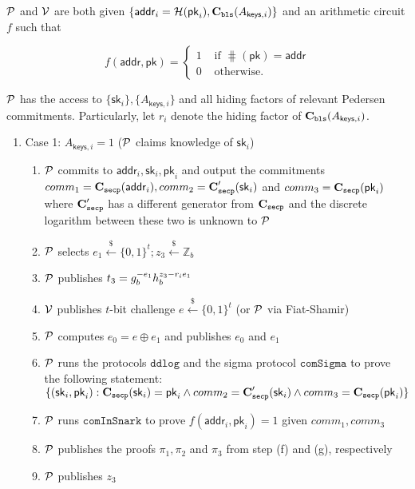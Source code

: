 
\begin{mdframed}
$\mathcal{P}$ and $\mathcal{V}$ are both given $\{\mathsf{addr}_i=\mathcal{H}(\mathsf{pk}_i),\textbf{C}_\texttt{bls}(A_{\mathsf{keys},i})\}$ and an arithmetic circuit $f$ such that 

\[
    f(\mathsf{addr},\mathsf{pk})=\left\{
        \begin{aligned}
            1 & \text{ if } \hash(\mathsf{pk})=\mathsf{addr} \\
            0 & \text{ otherwise.}
        \end{aligned}
    \right.
\]

$\mathcal{P}$ has the access to $\{\mathsf{sk}_i\},\{A_{\mathsf{keys},i}\}$ and all hiding factors of relevant Pedersen commitments. Particularly, let $r_i$ denote the hiding factor of $\textbf{C}_\texttt{bls}(A_{\mathsf{keys},i})$.
\begin{enumerate}   
    \item Case 1: $A_{\mathsf{keys},i}=1$ ($\mathcal{P}$ claims knowledge of $\mathsf{sk}_i$)
    \begin{enumerate}  
        \item $\mathcal{P}$ commits to $\mathsf{addr}_i,\mathsf{sk}_i,\mathsf{pk}_i$ and output the commitments $comm_1=\textbf{C}_\texttt{secp}(\mathsf{addr}_i),comm_2=\textbf{C}_\texttt{secp}^\prime(\mathsf{sk}_i)$ and $comm_3=\textbf{C}_\texttt{secp}(\mathsf{pk}_i)$ where $\textbf{C}_\texttt{secp}^\prime$ has a different generator from $\textbf{C}_\texttt{secp}$ and the discrete logarithm between these two is unknown to $\mathcal{P}$
        \item $\mathcal{P}$ selects $e_1\stackrel{\$}{\leftarrow} \{0,1\}^t; z_3\stackrel{\$}{\leftarrow}\mathbb{Z}_b$
        \item $\mathcal{P}$ publishes $t_3=g_b^{-e_1}h_b^{z_3-r_ie_1}$
        \item $\mathcal{V}$ publishes $t$-bit challenge $e\stackrel{\$}{\leftarrow} \{0,1\}^t$ (or $\mathcal{P}$ via Fiat-Shamir)
        \item $\mathcal{P}$ computes $e_0=e\oplus{e_1}$ and publishes $e_0$ and $e_1$
        \item $\mathcal{P}$ runs the protocols $\texttt{ddlog}$ and the sigma protocol $\texttt{comSigma}$ to prove the following statement: $\{(\mathsf{sk}_i,\mathsf{pk}_i):\textbf{C}_\texttt{secp}(\mathsf{sk}_i)=\mathsf{pk}_i\land{comm_2}=\textbf{C}_\texttt{secp}^\prime(\mathsf{sk}_i)\land{comm_3=\textbf{C}_\texttt{secp}(\mathsf{pk}_i)}\}$
        \item $\mathcal{P}$ runs $\texttt{comInSnark}$ to prove $f(\mathsf{addr}_i,\mathsf{pk}_i)=1$ given $comm_1,comm_3$
        \item $\mathcal{P}$ publishes the proofs $\pi_1,\pi_2$ and $\pi_3$ from step (f) and (g), respectively
        \item $\mathcal{P}$ publishes $z_3$
    \end{enumerate}
    

\end{enumerate}
\end{mdframed}
